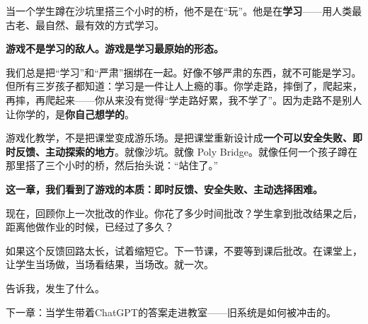 当一个学生蹲在沙坑里搭三个小时的桥，他不是在``玩''。他是在\textbf{学习}——用人类最古老、最自然、最有效的方式学习。

\begin{shiyu-note}
\label{note:chap2}

\textbf{游戏不是学习的敌人。游戏是学习最原始的形态。}

我们总是把``学习''和``严肃''捆绑在一起。好像不够严肃的东西，就不可能是学习。但所有三岁孩子都知道：学习是一件让人上瘾的事。你学走路，摔倒了，爬起来，再摔，再爬起来——你从来没有觉得``学走路好累，我不学了''。因为走路不是别人让你学的，是\textbf{你自己想学的}。

游戏化教学，不是把课堂变成游乐场。是把课堂重新设计成\textbf{一个可以安全失败、即时反馈、主动探索的地方}。就像沙坑。就像 Poly Bridge。就像任何一个孩子蹲在那里搭了三个小时的桥，然后抬头说：``站住了。''

\end{shiyu-note}

\vspace{1cm}

\begin{decision-point}
\label{decision:chap2}

\noindent\textbf{这一章，我们看到了游戏的本质：即时反馈、安全失败、主动选择困难。}

\vspace{0.3cm}

\noindent 现在，回顾你上一次批改的作业。你花了多少时间批改？学生拿到批改结果之后，距离他做作业的时候，已经过了多久？

\noindent 如果这个反馈回路太长，试着缩短它。下一节课，不要等到课后批改。在课堂上，让学生当场做，当场看结果，当场改。就一次。

\noindent 告诉我，发生了什么。
\end{decision-point}

\vspace{0.5cm}

\begin{flushright}
{\small\color{muted} 下一章：当学生带着ChatGPT的答案走进教室——旧系统是如何被冲击的。}
\end{flushright}
